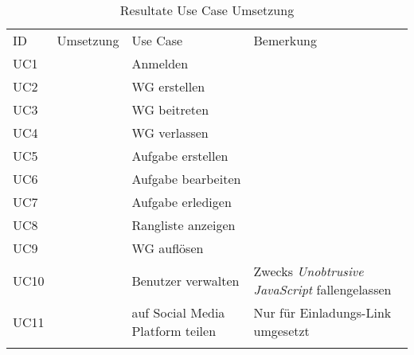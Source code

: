 \begin{table}[H]
	\tablestyle
	\tablealtcolored
	\begin{tabularx}{\textwidth}{l c l X}
		\tableheadcolor
		\tablehead ID &
		\tablehead Umsetzung &
		\tablehead Use Case &
		\tablehead Bemerkung \tabularnewline
		\tablebody
			UC1 & \faOk & Anmelden &  \tabularnewline
			UC2 & \faOk & WG erstellen &  \tabularnewline
			UC3 & \faOk & WG beitreten &  \tabularnewline
			UC4 & \faOk & WG verlassen &  \tabularnewline
			UC5 & \faOk & Aufgabe erstellen &  \tabularnewline
			UC6 & \faOk & Aufgabe bearbeiten &  \tabularnewline
			UC7 & \faOk & Aufgabe erledigen &  \tabularnewline
			UC8 & \faOk & Rangliste anzeigen &  \tabularnewline
			UC9 & \faOk & WG auflösen &  \tabularnewline
			UC10 & \faExclamation & Benutzer verwalten & Zwecks \emph{Unobtrusive JavaScript} fallengelassen \tabularnewline
			UC11 & \faExclamation & auf Social Media Platform teilen & Nur für Einladungs-Link umgesetzt \tabularnewline
		\tableend
	\end{tabularx}
	\caption{Resultate Use Case Umsetzung}
	\label{tab:useCaseResults}
\end{table}